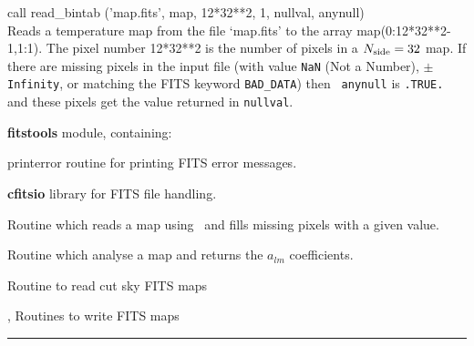 \begin{example}
{
call read\_bintab ('map.fits', map, 12*32**2, 1, nullval, anynull)  \\
}
{
Reads a \healpix temperature map from the file `map.fits' to the array
map(0:12*32**2-1,1:1). The pixel number 12*32**2 is the number of pixels in a
${N_{\rm side}}=32$ \healpix map. 
If there are missing pixels in the input file (with
value {\tt NaN} (Not a Number), $\pm${\tt Infinity}, or matching the FITS
keyword {\tt BAD\_DATA}) then {\tt
anynull} is {\tt .TRUE.} and these pixels get the value returned in {\tt nullval}. 
}
\end{example}

\begin{modules}
  \begin{sulist}{} %
  \item[\textbf{fitstools}] module, containing:
  \item[printerror] routine for printing FITS error messages.
  \item[\textbf{cfitsio}] library for FITS file handling.		
  \end{sulist}
\end{modules}

\begin{related}
  \begin{sulist}{} %
  \item[\htmlref{input\_map}{sub:input_map}] Routine which reads a map using \thedocid\ and fills missing pixels with a given value.
  \item[\htmlref{map2alm}{sub:map2alm}] Routine which analyse a map and returns the $a_{lm}$
  coefficients.
  \item[\htmlref{read\_fits\_cut4}{sub:read_fits_cut4}] Routine to read cut sky \healpix FITS maps
  \item[\htmlref{write\_plm}{sub:write_plm}, \htmlref{write\_bintab}{sub:write_bintab}] Routines to write \healpix FITS maps
  \end{sulist}
\end{related}

\rule{\hsize}{2mm}

\newpage
